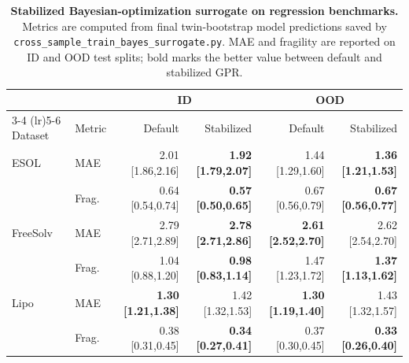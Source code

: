 \begin{table}[t]
  \centering
  \caption{\textbf{Stabilized Bayesian-optimization surrogate on regression benchmarks.} Metrics are computed from final twin-bootstrap model predictions saved by \texttt{cross\_sample\_train\_bayes\_surrogate.py}. MAE and fragility are reported on ID and OOD test splits; bold marks the better value between default and stabilized GPR.}
  \label{tab:bayes-surrogate-regression}
  \scriptsize
  \setlength{\tabcolsep}{3pt}
  \begin{tabular}{llrrrr}
    \toprule
    & & \multicolumn{2}{c}{ID} & \multicolumn{2}{c}{OOD} \\
    \cmidrule(lr){3-4} \cmidrule(lr){5-6}
    Dataset & Metric & Default & Stabilized & Default & Stabilized \\
    \midrule
    ESOL & MAE & 2.01 [1.86,2.16] & \textbf{1.92 [1.79,2.07]} & 1.44 [1.29,1.60] & \textbf{1.36 [1.21,1.53]} \\
     & Frag. & 0.64 [0.54,0.74] & \textbf{0.57 [0.50,0.65]} & 0.67 [0.56,0.79] & \textbf{0.67 [0.56,0.77]} \\
    \addlinespace
    FreeSolv & MAE & 2.79 [2.71,2.89] & \textbf{2.78 [2.71,2.86]} & \textbf{2.61 [2.52,2.70]} & 2.62 [2.54,2.70] \\
     & Frag. & 1.04 [0.88,1.20] & \textbf{0.98 [0.83,1.14]} & 1.47 [1.23,1.72] & \textbf{1.37 [1.13,1.62]} \\
    \addlinespace
    Lipo & MAE & \textbf{1.30 [1.21,1.38]} & 1.42 [1.32,1.53] & \textbf{1.30 [1.19,1.40]} & 1.43 [1.32,1.57] \\
     & Frag. & 0.38 [0.31,0.45] & \textbf{0.34 [0.27,0.41]} & 0.37 [0.30,0.45] & \textbf{0.33 [0.26,0.40]} \\
    \bottomrule
  \end{tabular}
\end{table}

